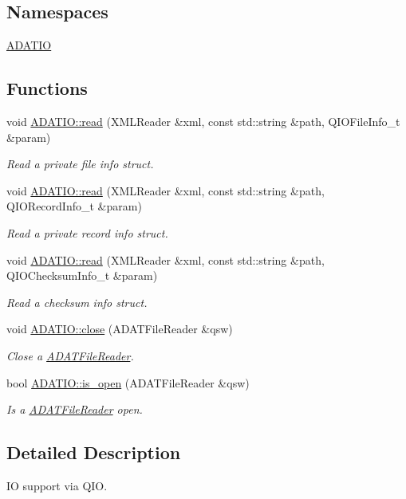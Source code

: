 \subsection*{Namespaces}
\begin{DoxyCompactItemize}
\item 
 \mbox{\hyperlink{namespaceADATIO}{A\+D\+A\+T\+IO}}
\end{DoxyCompactItemize}
\subsection*{Functions}
\begin{DoxyCompactItemize}
\item 
void \mbox{\hyperlink{namespaceADATIO_ac8ef7ea6a40421510ad5578b6fad884e}{A\+D\+A\+T\+I\+O\+::read}} (X\+M\+L\+Reader \&xml, const std\+::string \&path, Q\+I\+O\+File\+Info\+\_\+t \&param)
\begin{DoxyCompactList}\small\item\em Read a private file info struct. \end{DoxyCompactList}\item 
void \mbox{\hyperlink{namespaceADATIO_ac5827e268402afb3a0bb4ebbcec97706}{A\+D\+A\+T\+I\+O\+::read}} (X\+M\+L\+Reader \&xml, const std\+::string \&path, Q\+I\+O\+Record\+Info\+\_\+t \&param)
\begin{DoxyCompactList}\small\item\em Read a private record info struct. \end{DoxyCompactList}\item 
void \mbox{\hyperlink{namespaceADATIO_ab39e59b5ba8a584a1c5afd164173b9e7}{A\+D\+A\+T\+I\+O\+::read}} (X\+M\+L\+Reader \&xml, const std\+::string \&path, Q\+I\+O\+Checksum\+Info\+\_\+t \&param)
\begin{DoxyCompactList}\small\item\em Read a checksum info struct. \end{DoxyCompactList}\item 
void \mbox{\hyperlink{group__qio_gac32c771b58d87e4ef4af62a7ad2e5c0d}{A\+D\+A\+T\+I\+O\+::close}} (A\+D\+A\+T\+File\+Reader \&qsw)
\begin{DoxyCompactList}\small\item\em Close a \mbox{\hyperlink{classADATIO_1_1ADATFileReader}{A\+D\+A\+T\+File\+Reader}}. \end{DoxyCompactList}\item 
bool \mbox{\hyperlink{group__qio_gad9b8cab72f011dd46c24a51e8a1c756a}{A\+D\+A\+T\+I\+O\+::is\+\_\+open}} (A\+D\+A\+T\+File\+Reader \&qsw)
\begin{DoxyCompactList}\small\item\em Is a \mbox{\hyperlink{classADATIO_1_1ADATFileReader}{A\+D\+A\+T\+File\+Reader}} open. \end{DoxyCompactList}\end{DoxyCompactItemize}


\subsection{Detailed Description}
IO support via Q\+IO. 

